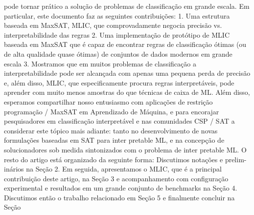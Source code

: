 \documentclass[a4paper, 12 pt]{article}
\begin{document}
pode tornar prático a solução de problemas de classificação em grande escala.
Em particular, este documento faz as seguintes contribuições:
1. Uma estrutura baseada em MaxSAT, MLIC, que comprovadamente negocia precisão vs.
interpretabilidade das regras
2. Uma implementação de protótipo de MLIC baseada em MaxSAT que é capaz
de encontrar regras de classificação ótimas (ou de alta qualidade quase ótimas) de
conjuntos de dados modernos em grande escala
3. Mostramos que em muitos problemas de classificação a interpretabilidade pode ser alcançada
com apenas uma pequena perda de precisão e, além disso, MLIC, que especificamente
procura regras interpretáveis, pode aprender com muito menos amostras do que
técnicas de caixa de ML.
Além disso, esperamos compartilhar nosso entusiasmo com aplicações de restrição
programação / MaxSAT em Aprendizado de Máquina, e para encorajar pesquisadores em
classificação interpretável e nas comunidades CSP / SAT a considerar
este tópico mais adiante: tanto no desenvolvimento de novas formulações baseadas em SAT para inter
pretable ML, e na concepção de solucionadores sob medida sintonizados com o problema de inter
pretable ML.
O resto do artigo está organizado da seguinte forma: Discutimos notações e prelim-
inários na Seção 2. Em seguida, apresentamos o MLIC, que é a principal contribuição
deste artigo, na Seção 3 e acompanhamento com configuração experimental e resultados
em um grande conjunto de benchmarks na Seção 4. Discutimos então o trabalho relacionado em
Seção 5 e finalmente concluir na Seção
\end{document}
